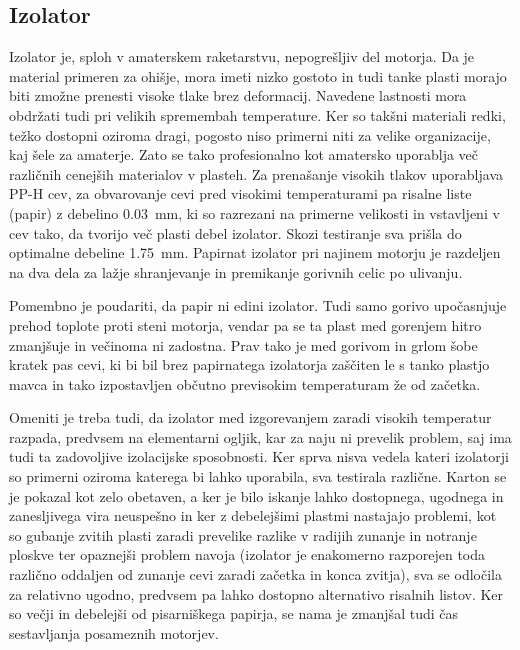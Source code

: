 \documentclass[titlepage, a4paper, twoside, final, 12pt]{article}
\begin{document}
			\subsection{Izolator}
			Izolator je, sploh v amaterskem raketarstvu, nepogrešljiv del motorja. Da je material primeren za ohišje, mora imeti nizko gostoto
			in tudi tanke plasti morajo biti zmožne prenesti visoke tlake brez deformacij. Navedene lastnosti mora obdržati tudi pri velikih spremembah temperature.
			Ker so takšni materiali redki, težko dostopni oziroma dragi, pogosto niso primerni niti za velike organizacije,
			kaj šele za amaterje. Zato se tako profesionalno kot amatersko uporablja več različnih cenejših materialov v plasteh. Za prenašanje visokih tlakov uporabljava PP-H cev,
			za obvarovanje cevi pred visokimi temperaturami pa risalne liste (papir) z debelino \SI{0,03}{mm}, ki so razrezani na primerne velikosti in vstavljeni v cev
			tako, da tvorijo več plasti debel izolator.\cite{Thermal_conductivity_of_Paper} Skozi testiranje sva prišla do optimalne debeline \SI{1,75}{mm}. 
			Papirnat izolator pri najinem motorju je razdeljen na dva dela za lažje shranjevanje 
			in premikanje gorivnih celic po ulivanju. 

			Pomembno je poudariti, da papir ni edini izolator. Tudi samo gorivo upočasnjuje prehod toplote proti steni motorja,
			vendar pa se ta plast med gorenjem hitro zmanjšuje in večinoma ni zadostna.
			Prav tako je med gorivom in grlom šobe kratek pas cevi, ki bi bil brez papirnatega izolatorja zaščiten le s tanko plastjo mavca in tako izpostavljen
			občutno previsokim temperaturam že od začetka.

			Omeniti je treba tudi, da izolator med izgorevanjem zaradi visokih temperatur razpada, predvsem na elementarni ogljik, kar za naju ni prevelik problem,
			saj ima tudi ta zadovoljive izolacijske sposobnosti.\cite{Thermal_conductivity_of_Carbon}
			Ker sprva nisva vedela kateri izolatorji so primerni oziroma katerega bi lahko uporabila, sva testirala različne. Karton se je pokazal kot zelo obetaven,
			a ker je bilo iskanje lahko dostopnega, ugodnega in zanesljivega vira neuspešno in ker z debelejšimi plastmi nastajajo problemi, kot so gubanje zvitih plasti zaradi prevelike razlike
			v radijih zunanje in notranje ploskve ter opaznejši problem navoja (izolator je enakomerno razporejen toda različno oddaljen od zunanje cevi zaradi začetka in konca zvitja), 
			sva se odločila za relativno ugodno, predvsem pa lahko dostopno alternativo risalnih listov. Ker so večji in debelejši od pisarniškega papirja,
			se nama je zmanjšal tudi čas sestavljanja posameznih motorjev.
\end{document}
